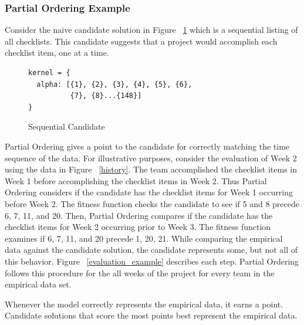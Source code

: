 \documentclass[preprint,12pt,3p]{elsarticle}
\begin{document}

\subsubsection{Partial Ordering Example}

Consider the naive candidate solution in Figure ~\ref{sequential_candidate} which is a sequential listing of all checklists. This candidate suggests that a project would accomplish each checklist item, one at a time.

\begin{figure}[!htb]
\begin{verbatim}
kernel = {
  alpha: [{1}, {2}, {3}, {4}, {5}, {6}, 
          {7}, {8}...{148}]
}
\end{verbatim}
 \caption{Sequential Candidate}
 \label{sequential_candidate}
\end{figure}

Partial Ordering gives a point to the candidate for correctly matching the time sequence of the data. For illustrative purposes, consider the evaluation of Week 2 using the data in Figure ~\ref{history}. The team accomplished the checklist items in Week 1 before accomplishing the checklist items in Week 2. Thus Partial Ordering considers if the candidate has the checklist items for Week 1 occurring before Week 2. The fitness function checks the candidate to see if 5 and 8 precede 6, 7, 11, and 20. Then, Partial Ordering compares if the candidate has the checklist items for Week 2 occurring prior to Week 3. The fitness function examines if 6, 7, 11, and 20 precede 1, 20, 21. While comparing the empirical data against the candidate solution, the candidate represents some, but not all of this behavior. Figure ~\ref{evaluation_example} describes each step. Partial Ordering follows this procedure for the all weeks of the project for every team in the empirical data set.

Whenever the model correctly represents the empirical data, it earns a point. Candidate solutions that score the most points best represent the empirical data.
\end{document}

